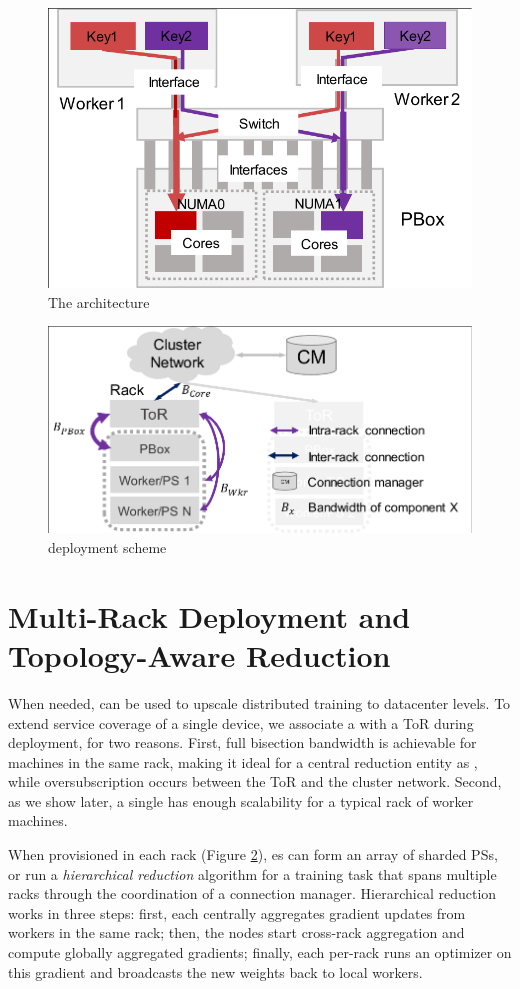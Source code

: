 \begin{figure}[t!]
	\centering
	\includegraphics[width=.6\linewidth,trim=2 1 1 1,clip]{Figures/PHubOverview.pdf}
	\caption{The \pbox architecture}
	\label{fig:phub}
\end{figure}



\begin{figure}[t!]
	\centering
	\includegraphics[width=.7\linewidth,trim=3 1 1 2,clip]{Figures/PBoxDeployment.pdf}
	\caption{\pbox deployment scheme}
	\label{fig:pBoxDeployment}
\end{figure}


\section{Multi-Rack Deployment and Topology-Aware Reduction}
\label{sec:hierarchicalReduction}
When needed, \pbox can be used to upscale distributed training to datacenter levels. To extend service coverage of a single \pbox device, we associate a \pbox with a ToR during deployment, for two reasons. First, full bisection bandwidth is achievable for machines in the same rack, making it ideal for a central reduction entity as \pbox, while oversubscription occurs between the ToR and the cluster network. Second, as we show later, a single \pbox has enough scalability for a typical rack of worker machines.

When provisioned in each rack (Figure \ref{fig:pBoxDeployment}), \pbox{}es can form an array of sharded PSs, or run a \textit{hierarchical reduction} algorithm for a training task that spans multiple racks through the coordination of a connection manager. Hierarchical reduction works in three steps: first, each \pbox centrally aggregates gradient updates from workers in the same rack; then, the \pbox{} nodes start cross-rack aggregation and compute globally aggregated gradients; finally, each per-rack \pbox runs an optimizer on this gradient and broadcasts the new weights back to local workers.

